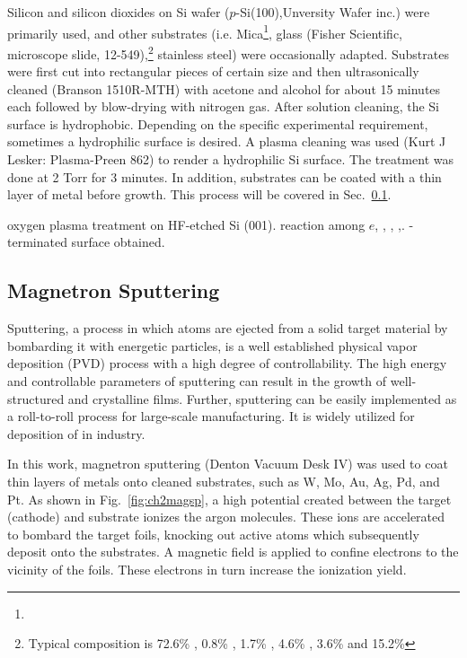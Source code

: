 Silicon and silicon dioxides on Si wafer ($p$-Si(100),Unversity Wafer inc.) were primarily used, and other substrates (i.e. Mica\footnote{ }, glass (Fisher Scientific, microscope slide, 12-549),\footnote{Typical composition is 72.6\% , 0.8\% , 1.7\% , 4.6\% , 3.6\%  and 15.2\% } stainless steel) were occasionally adapted. Substrates were first cut into rectangular pieces of certain size and then ultrasonically cleaned (Branson 1510R-MTH) with acetone and alcohol for about 15 minutes each followed by blow-drying with nitrogen gas. After solution cleaning, the Si surface is hydrophobic. Depending on the specific experimental requirement, sometimes a hydrophilic surface is desired. A plasma cleaning was used (Kurt J Lesker: Plasma-Preen 862) to render a hydrophilic Si surface. The treatment was done at 2 Torr  for 3 minutes. In addition, substrates can be coated with a thin layer of metal before growth. This process will be covered  in Sec.~\ref{sec:mag}.

oxygen plasma treatment on HF-etched Si (001). reaction among $e$, , , ,. -terminated surface obtained.\cite{Habib2010}

\subsection{Magnetron Sputtering}\label{sec:mag}

Sputtering, a process in which atoms are ejected from a solid target material by bombarding it with energetic particles, is a well established physical vapor deposition (PVD) process with a high degree of controllability. The high energy and controllable parameters of sputtering can result in the growth of well-structured and crystalline films. Further, sputtering can be easily implemented as a roll-to-roll process for large-scale manufacturing. It is widely utilized for deposition of  in industry.

In this work, magnetron sputtering (Denton Vacuum Desk IV) was used to coat thin layers of metals onto cleaned substrates, such as W, Mo, Au, Ag, Pd, and Pt. As shown in Fig.~\ref{fig:ch2magsp}, a high potential created between the target (cathode) and substrate ionizes the argon molecules. These ions are accelerated to bombard the target foils, knocking out active atoms which subsequently deposit onto the substrates. A magnetic field is applied to confine electrons to the vicinity of the foils. These electrons in turn increase the ionization yield. 

